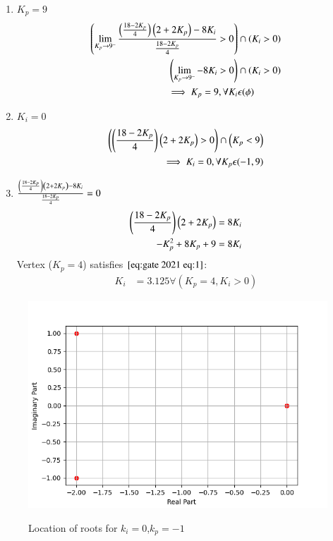 \documentclass[journal,12pt,onecolumn]{IEEEtran}
\theoremstyle{remark}
\begin{document}
    \begin{enumerate}
        \item $K_p=9$\\
         \begin{align}
       \left(\lim_{K_p\to9^-} \frac{\left(\frac{18-2K_p}{4}\right)\left(2 + 2K_p\right)-8K_i}{\frac{18-2K_p}{4}} > 0\right) &\cap \left(K_i > 0\right)\\
       \left(\lim_{K_p\to9^-} -8K_i > 0\right) &\cap \left({K_i > 0}\right)\\
  \implies K_p=9 , \forall K_i &\epsilon (\phi)
    \end{align}
    \item  $K_i=0$\\
    \begin{align}
        \left(\left(\frac{18-2K_p}{4}\right)\left(2 + 2K_p\right) > 0\right)  \cap \left(K_p < 9\right)\\
        \implies K_i=0 , \forall K_p \epsilon (-1 , 9)
    \end{align}
    \item $\frac{\left(\frac{18-2K_p}{4}\right)\left(2 + 2K_p\right)-8K_i}{\frac{18-2K_p}{4}} = 0$\\
        \begin{align}
            \left(\frac{18-2K_p}{4}\right)\left(2 + 2K_p\right) = 8K_i\\
             -K_p^2 +8K_p + 9 = 8K_i
        \end{align}
        Vertex ($K_p=4$) satisfies $\eqref{eq:gate 2021 eq:1}$:
        \begin{align}
            K_i &= 3.125 \forall (K_p = 4 ,K_i>0)
        \end{align}
    \end{enumerate}

\begin{figure}[!ht]    
    \centering
\graphicspath{ {figs/} }
\includegraphics[width=\columnwidth]{graph_1}
\label{figure:ee25-gate4-graph1}
\caption{Location of roots for $k_i=0$,$k_p=-1$}
\end{figure}
\end{document}
